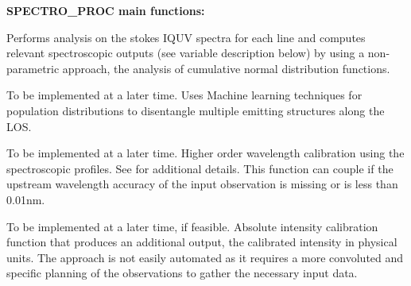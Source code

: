 \documentclass{article}
\begin{document}
\textbf{SPECTRO\_PROC main functions:}
\begin{description}
    [font=\normalfont,leftmargin=2.1in,style=multiline]
    \item[CDF\_STATISTICS]
        Performs analysis on the stokes IQUV spectra for each line and computes relevant spectroscopic outputs (see variable description below) by using a non-parametric approach, the analysis of cumulative normal distribution functions.
    \item[(Opt.) ML\_LOSDISENTANGLE]
        To be implemented at a later time. Uses Machine learning techniques for population distributions to disentangle multiple emitting structures along the LOS.
    \item[(Opt.) LEV2CALIB\_WAVE]
        To be implemented at a later time. Higher order wavelength calibration using the spectroscopic profiles. See \citet{Ali+2021} for additional details. This function can couple if the upstream wavelength accuracy of the input observation is missing or is less than 0.01nm.
    \item[(Opt.) LEV2CALIB\_ABSINT]
        To be implemented at a later time, if feasible. Absolute intensity calibration function that produces an additional output, the calibrated intensity in physical units. The approach is not easily automated as it requires a more convoluted and specific planning of the observations to gather the necessary input data.                        
\end{description}

~
\end{document}
